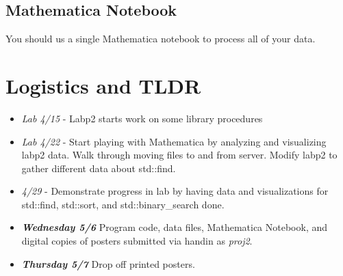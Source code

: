\documentclass[]{tufte-handout}
\begin{document}
\subsection{Mathematica Notebook}

You should us a single Mathematica notebook to process all of your data. 

\section{Logistics and TLDR}


\begin{itemize}
\item \textit{Lab 4/15} - Labp2 starts work on some library procedures 
\item \textit{Lab 4/22} - Start playing with Mathematica by analyzing and visualizing labp2 data. Walk through moving files to and from server. Modify labp2 to gather different data about std::find. 
\item \textit{4/29} - Demonstrate progress in lab by having data and visualizations for std::find, std::sort, and std::binary\_search done.
\item \textit{\textbf{Wednesday 5/6}} Program code, data files, Mathematica Notebook, and digital copies of posters submitted via handin as \textit{proj2}. 
\item \textit{\textbf{Thursday 5/7}} Drop off printed posters.
\end{itemize}
\end{document}
